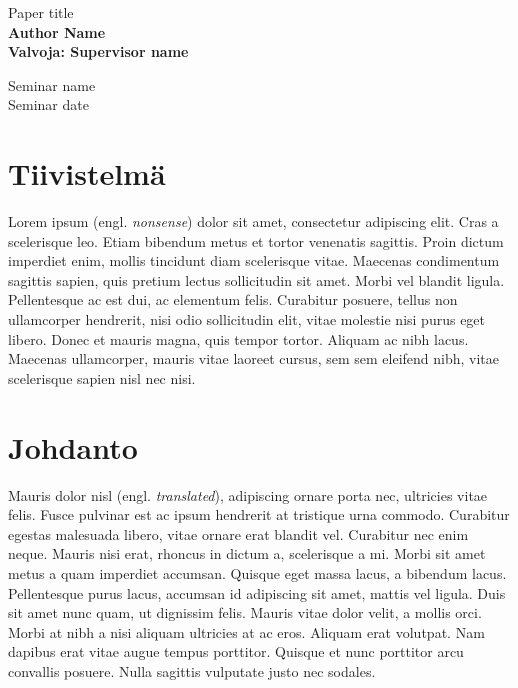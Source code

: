 \documentclass[a4paper, 12pt]{article}
\newcommand{\TITLE}{Paper title}
\newcommand{\AUTHOR}{Author Name}
\newcommand{\SUPERVISOR}{Supervisor name}
\newcommand{\SEMINARNAME}{Seminar name}
\newcommand{\SEMINARDATE}{Seminar date}
\newcommand{\engl}[1]{(engl. \emph{{#1}})}
\begin{document}
\begin{titlepage}
\vspace{40mm}
\begin{center}
	\Huge{\textsf{\TITLE}}\\
	\vspace{30mm}
	\large \textbf{\AUTHOR}\\
	\vspace{2mm}
	\large \textbf{Valvoja: \SUPERVISOR}\\
	\vspace{10mm}


	\vspace{10mm}
	\SEMINARNAME\\
	\vspace{2mm}
	\SEMINARDATE\\
\end{center}
\end{titlepage}


\newpage
\section{Tiivistelmä}

Lorem ipsum \engl{nonsense} dolor sit amet, consectetur adipiscing elit. Cras a scelerisque leo. Etiam bibendum metus et tortor venenatis sagittis. Proin dictum imperdiet enim, mollis tincidunt diam scelerisque vitae. Maecenas condimentum sagittis sapien, quis pretium lectus sollicitudin sit amet. Morbi vel blandit ligula. Pellentesque ac est dui, ac elementum felis. Curabitur posuere, tellus non ullamcorper hendrerit, nisi odio sollicitudin elit, vitae molestie nisi purus eget libero. Donec et mauris magna, quis tempor tortor. Aliquam ac nibh lacus. Maecenas ullamcorper, mauris vitae laoreet cursus, sem sem eleifend nibh, vitae scelerisque sapien nisl nec nisi.


\newpage
{}
\tableofcontents


\clearpage
\section{Johdanto}
\label{section:johdanto}

Mauris dolor nisl \engl{translated}, adipiscing ornare porta nec, ultricies vitae felis. Fusce pulvinar est ac ipsum hendrerit at tristique urna commodo. Curabitur egestas malesuada libero, vitae ornare erat blandit vel. Curabitur nec enim neque. Mauris nisi erat, rhoncus in dictum a, scelerisque a mi. Morbi sit amet metus a quam imperdiet accumsan. Quisque eget massa lacus, a bibendum lacus. Pellentesque purus lacus, accumsan id adipiscing sit amet, mattis vel ligula. Duis sit amet nunc quam, ut dignissim felis. Mauris vitae dolor velit, a mollis orci. Morbi at nibh a nisi aliquam ultricies at ac eros. Aliquam erat volutpat. Nam dapibus erat vitae augue tempus porttitor. Quisque et nunc porttitor arcu convallis posuere. Nulla sagittis vulputate justo nec sodales.
\end{document}
